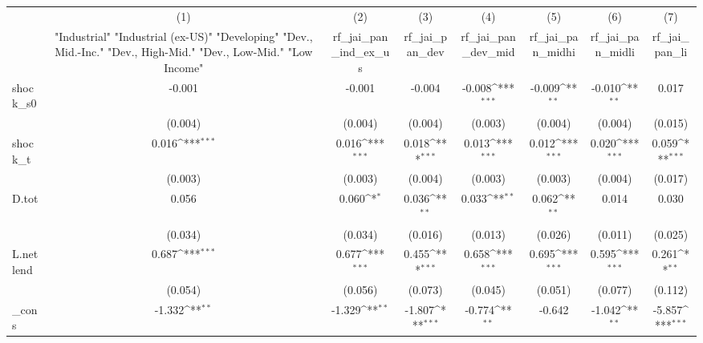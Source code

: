 {
\def\sym#1{\ifmmode^{#1}\else\(^{#1}\)\fi}
\begin{tabular}{l*{7}{c}}
\toprule
            &\multicolumn{1}{c}{(1)}&\multicolumn{1}{c}{(2)}&\multicolumn{1}{c}{(3)}&\multicolumn{1}{c}{(4)}&\multicolumn{1}{c}{(5)}&\multicolumn{1}{c}{(6)}&\multicolumn{1}{c}{(7)}\\
            &\multicolumn{1}{c}{ "Industrial" "Industrial (ex-US)" "Developing" "Dev., Mid.-Inc." "Dev., High-Mid."  "Dev., Low-Mid." "Low Income" }&\multicolumn{1}{c}{rf\_jai\_pan\_ind\_ex\_us}&\multicolumn{1}{c}{rf\_jai\_pan\_dev}&\multicolumn{1}{c}{rf\_jai\_pan\_dev\_mid}&\multicolumn{1}{c}{rf\_jai\_pan\_midhi}&\multicolumn{1}{c}{rf\_jai\_pan\_midli}&\multicolumn{1}{c}{rf\_jai\_pan\_li}\\
\midrule
shock\_s0    &      -0.001         &      -0.001         &      -0.004         &      -0.008\sym{***}&      -0.009\sym{**} &      -0.010\sym{**} &       0.017         \\
            &     (0.004)         &     (0.004)         &     (0.004)         &     (0.003)         &     (0.004)         &     (0.004)         &     (0.015)         \\
\addlinespace
shock\_t     &       0.016\sym{***}&       0.016\sym{***}&       0.018\sym{***}&       0.013\sym{***}&       0.012\sym{***}&       0.020\sym{***}&       0.059\sym{***}\\
            &     (0.003)         &     (0.003)         &     (0.004)         &     (0.003)         &     (0.003)         &     (0.004)         &     (0.017)         \\
\addlinespace
D.tot       &       0.056         &       0.060\sym{*}  &       0.036\sym{**} &       0.033\sym{**} &       0.062\sym{**} &       0.014         &       0.030         \\
            &     (0.034)         &     (0.034)         &     (0.016)         &     (0.013)         &     (0.026)         &     (0.011)         &     (0.025)         \\
\addlinespace
L.netlend   &       0.687\sym{***}&       0.677\sym{***}&       0.455\sym{***}&       0.658\sym{***}&       0.695\sym{***}&       0.595\sym{***}&       0.261\sym{**} \\
            &     (0.054)         &     (0.056)         &     (0.073)         &     (0.045)         &     (0.051)         &     (0.077)         &     (0.112)         \\
\addlinespace
\_cons      &      -1.332\sym{**} &      -1.329\sym{**} &      -1.807\sym{***}&      -0.774\sym{**} &      -0.642         &      -1.042\sym{**} &      -5.857\sym{***}\\

\end{tabular}}
